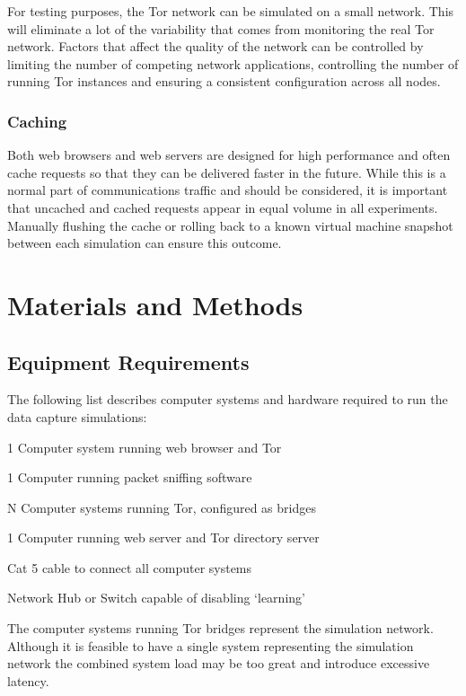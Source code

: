 \documentclass{ecuthesis}
\begin{document}
For testing purposes, the Tor network can be simulated on a small network. This will eliminate a lot of the variability that comes from monitoring the real Tor network. Factors that affect the quality of the network can be controlled by limiting the number of competing network applications, controlling the number of running Tor instances and ensuring a consistent configuration across all nodes.

\subsection{Caching}

Both web browsers and web servers are designed for high performance and often cache requests so that they can be delivered faster in the future. While this is a normal part of communications traffic and should be considered, it is important that uncached and cached requests appear in equal volume in all experiments. Manually flushing the cache or rolling back to a known virtual machine snapshot between each simulation can ensure this outcome.

\chapter{Materials and Methods}

\section{Equipment Requirements}

The following list describes computer systems and hardware required to run the data capture simulations:

\begin{itemize*}
\item 1 Computer system running web browser and Tor
\item 1 Computer running packet sniffing software
\item N Computer systems running Tor, configured as bridges
\item 1 Computer running web server and Tor directory server
\item Cat 5 cable to connect all computer systems
\item Network Hub or Switch capable of disabling ‘learning’ \citep{website:hub-reference}
\end{itemize*}

The computer systems running Tor bridges represent the simulation network. Although it is feasible to have a single system representing the simulation network the combined system load may be too great and introduce  excessive latency.
\end{document}
